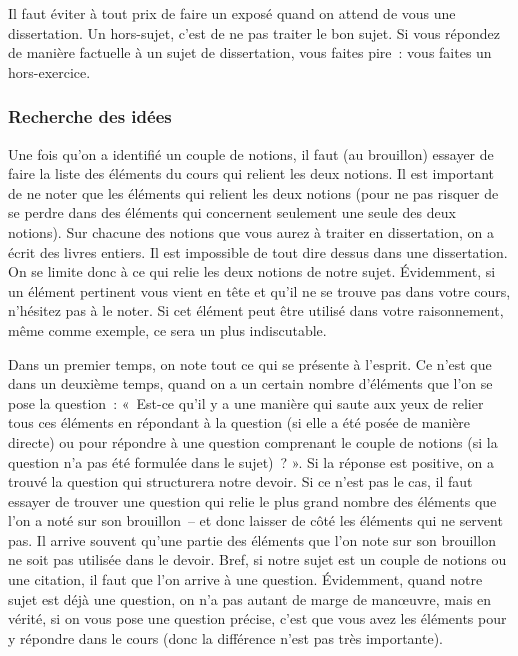 \documentclass[
  letterpaper,
  DIV=11,
  numbers=noendperiod]{scrartcl}
\begin{document}
Il faut éviter à tout prix de faire un exposé quand on attend de vous
une dissertation. Un hors-sujet, c'est de ne pas traiter le bon sujet.
Si vous répondez de manière factuelle à un sujet de dissertation, vous
faites pire~: vous faites un hors-exercice.

\subsubsection{Recherche des idées}\label{recherche-des-iduxe9es}

Une fois qu'on a identifié un couple de notions, il faut (au brouillon)
essayer de faire la liste des éléments du cours qui relient les deux
notions. Il est important de ne noter que les éléments qui relient les
deux notions (pour ne pas risquer de se perdre dans des éléments qui
concernent seulement une seule des deux notions). Sur chacune des
notions que vous aurez à traiter en dissertation, on a écrit des livres
entiers. Il est impossible de tout dire dessus dans une dissertation. On
se limite donc à ce qui relie les deux notions de notre sujet.
Évidemment, si un élément pertinent vous vient en tête et qu'il ne se
trouve pas dans votre cours, n'hésitez pas à le noter. Si cet élément
peut être utilisé dans votre raisonnement, même comme exemple, ce sera
un plus indiscutable.

Dans un premier temps, on note tout ce qui se présente à l'esprit. Ce
n'est que dans un deuxième temps, quand on a un certain nombre
d'éléments que l'on se pose la question~: «~Est-ce qu'il y a une manière
qui saute aux yeux de relier tous ces éléments en répondant à la
question (si elle a été posée de manière directe) ou pour répondre à une
question comprenant le couple de notions (si la question n'a pas été
formulée dans le sujet)~? ». Si la réponse est positive, on a trouvé la
question qui structurera notre devoir. Si ce n'est pas le cas, il faut
essayer de trouver une question qui relie le plus grand nombre des
éléments que l'on a noté sur son brouillon~-- et donc laisser de côté
les éléments qui ne servent pas. Il arrive souvent qu'une partie des
éléments que l'on note sur son brouillon ne soit pas utilisée dans le
devoir. Bref, si notre sujet est un couple de notions ou une citation,
il faut que l'on arrive à une question. Évidemment, quand notre sujet
est déjà une question, on n'a pas autant de marge de manœuvre, mais en
vérité, si on vous pose une question précise, c'est que vous avez les
éléments pour y répondre dans le cours (donc la différence n'est pas
très importante).
\end{document}
